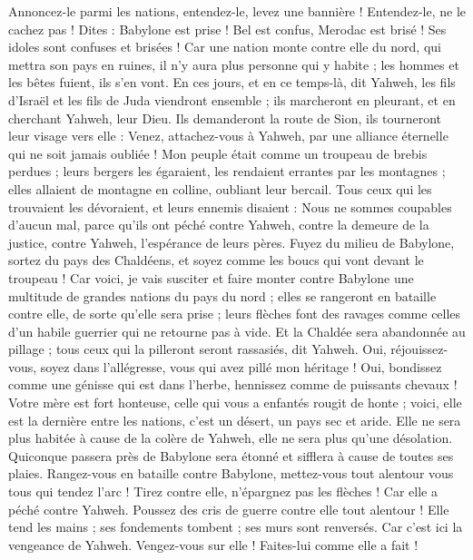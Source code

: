 \begin{multicols}{2}
Annoncez-le parmi les nations, entendez-le, levez une bannière ! Entendez-le, ne le cachez pas ! Dites : Babylone est prise ! Bel est confus, Merodac est brisé ! Ses idoles sont confuses et brisées !
Car une nation monte contre elle du nord, qui mettra son pays en ruines, il n'y aura plus personne qui y habite ; les hommes et les bêtes fuient, ils s'en vont.
En ces jours, et en ce temps-là, dit Yahweh, les fils d'Israël et les fils de Juda viendront ensemble ; ils marcheront en pleurant, et en cherchant Yahweh, leur Dieu.
Ils demanderont la route de Sion, ils tourneront leur visage vers elle : Venez, attachez-vous à Yahweh, par une alliance éternelle qui ne soit jamais oubliée !
Mon peuple était comme un troupeau de brebis perdues ; leurs bergers les égaraient, les rendaient errantes par les montagnes ; elles allaient de montagne en colline, oubliant leur bercail.
Tous ceux qui les trouvaient les dévoraient, et leurs ennemis disaient : Nous ne sommes coupables d'aucun mal, parce qu'ils ont péché contre Yahweh, contre la demeure de la justice, contre Yahweh, l'espérance de leurs pères.
Fuyez du milieu de Babylone, sortez du pays des Chaldéens, et soyez comme les boucs qui vont devant le troupeau !
Car voici, je vais susciter et faire monter contre Babylone une multitude de grandes nations du pays du nord ; elles se rangeront en bataille contre elle, de sorte qu'elle sera prise ; leurs flèches font des ravages comme celles d'un habile guerrier qui ne retourne pas à vide.
Et la Chaldée sera abandonnée au pillage ; tous ceux qui la pilleront seront rassasiés, dit Yahweh.
Oui, réjouissez-vous, soyez dans l'allégresse, vous qui avez pillé mon héritage ! Oui, bondissez comme une génisse qui est dans l'herbe, hennissez comme de puissants chevaux !
Votre mère est fort honteuse, celle qui vous a enfantés rougit de honte ; voici, elle est la dernière entre les nations, c'est un désert, un pays sec et aride.
Elle ne sera plus habitée à cause de la colère de Yahweh, elle ne sera plus qu'une désolation. Quiconque passera près de Babylone sera étonné et sifflera à cause de toutes ses plaies.
Rangez-vous en bataille contre Babylone, mettez-vous tout alentour vous tous qui tendez l'arc ! Tirez contre elle, n'épargnez pas les flèches ! Car elle a péché contre Yahweh.
Poussez des cris de guerre contre elle tout alentour ! Elle tend les mains ; ses fondements tombent ; ses murs sont renversés. Car c'est ici la vengeance de Yahweh. Vengez-vous sur elle ! Faites-lui comme elle a fait !

\end{multicols}
